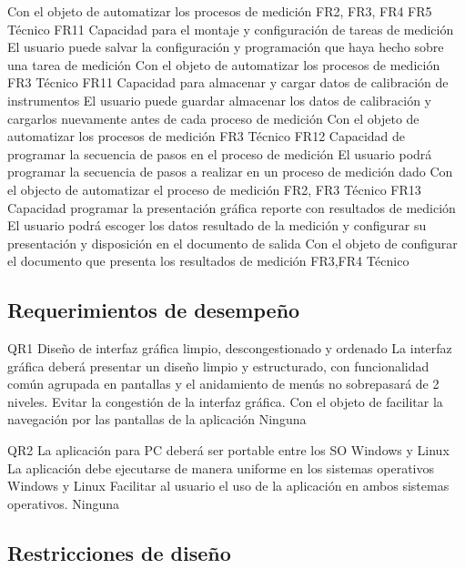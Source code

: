 \documentclass[paper=a4,oneside,fontsize=12pt]{article}
\begin{document}
			{Con el objeto de automatizar los procesos de medición}
			{FR2, FR3, FR4 FR5}
			{Técnico}			
		{FR11}
			{Capacidad para el montaje y configuración de tareas de medición}
			{El usuario puede salvar la configuración y programación que haya hecho sobre una tarea de medición}
			{Con el objeto de automatizar los procesos de medición}
			{FR3}
			{Técnico}								
		{FR11}
			{Capacidad para almacenar y cargar datos de calibración de instrumentos}
			{El usuario puede guardar almacenar los datos de calibración y cargarlos nuevamente antes de cada proceso de medición}
			{Con el objeto de automatizar los procesos de medición}
			{FR3}
			{Técnico}
		{FR12}
			{Capacidad de programar la secuencia de pasos en el proceso de medición}
			{El usuario podrá programar la secuencia de pasos a realizar en un proceso de medición dado}
			{Con el objecto de automatizar el proceso de medición}
			{FR2, FR3}	
			{Técnico}		
		{FR13}
			{Capacidad programar la presentación gráfica reporte con resultados de medición}
			{El usuario podrá escoger los datos resultado de la medición y configurar su presentación y disposición en el documento de salida}
			{Con el objeto de configurar el documento que presenta los resultados de medición}
			{FR3,FR4}
			{Técnico}		
			
	\subsection{Requerimientos de desempeño}	
	
		{QR1}
			{Diseño de interfaz gráfica limpio, descongestionado y ordenado}
			{La interfaz gráfica deberá presentar un diseño limpio y estructurado, con funcionalidad común agrupada en pantallas y el anidamiento de menús no sobrepasará de 2 niveles. Evitar la congestión de la interfaz gráfica.}
			{Con el objeto de facilitar la navegación por las pantallas de la aplicación}
			{Ninguna}
		
			{QR2}
				{La aplicación para PC deberá ser portable entre los SO Windows y Linux}
				{La aplicación debe ejecutarse de manera uniforme en los sistemas operativos Windows y Linux}
				{Facilitar al usuario el uso de la aplicación en ambos sistemas operativos.}
				{Ninguna}		
	
			
	\subsection{Restricciones de diseño}
	
\end{document}
